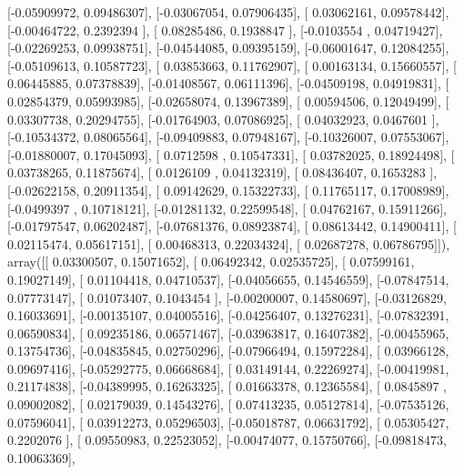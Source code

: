 \documentclass{article}
\begin{document}
       [-0.05909972,  0.09486307],
       [-0.03067054,  0.07906435],
       [ 0.03062161,  0.09578442],
       [-0.00464722,  0.2392394 ],
       [ 0.08285486,  0.1938847 ],
       [-0.0103554 ,  0.04719427],
       [-0.02269253,  0.09938751],
       [-0.04544085,  0.09395159],
       [-0.06001647,  0.12084255],
       [-0.05109613,  0.10587723],
       [ 0.03853663,  0.11762907],
       [ 0.00163134,  0.15660557],
       [ 0.06445885,  0.07378839],
       [-0.01408567,  0.06111396],
       [-0.04509198,  0.04919831],
       [ 0.02854379,  0.05993985],
       [-0.02658074,  0.13967389],
       [ 0.00594506,  0.12049499],
       [ 0.03307738,  0.20294755],
       [-0.01764903,  0.07086925],
       [ 0.04032923,  0.0467601 ],
       [-0.10534372,  0.08065564],
       [-0.09409883,  0.07948167],
       [-0.10326007,  0.07553067],
       [-0.01880007,  0.17045093],
       [ 0.0712598 ,  0.10547331],
       [ 0.03782025,  0.18924498],
       [ 0.03738265,  0.11875674],
       [ 0.0126109 ,  0.04132319],
       [ 0.08436407,  0.1653283 ],
       [-0.02622158,  0.20911354],
       [ 0.09142629,  0.15322733],
       [ 0.11765117,  0.17008989],
       [-0.0499397 ,  0.10718121],
       [-0.01281132,  0.22599548],
       [ 0.04762167,  0.15911266],
       [-0.01797547,  0.06202487],
       [-0.07681376,  0.08923874],
       [ 0.08613442,  0.14900411],
       [ 0.02115474,  0.05617151],
       [ 0.00468313,  0.22034324],
       [ 0.02687278,  0.06786795]]), array([[ 0.03300507,  0.15071652],
       [ 0.06492342,  0.02535725],
       [ 0.07599161,  0.19027149],
       [ 0.01104418,  0.04710537],
       [-0.04056655,  0.14546559],
       [-0.07847514,  0.07773147],
       [ 0.01073407,  0.1043454 ],
       [-0.00200007,  0.14580697],
       [-0.03126829,  0.16033691],
       [-0.00135107,  0.04005516],
       [-0.04256407,  0.13276231],
       [-0.07832391,  0.06590834],
       [ 0.09235186,  0.06571467],
       [-0.03963817,  0.16407382],
       [-0.00455965,  0.13754736],
       [-0.04835845,  0.02750296],
       [-0.07966494,  0.15972284],
       [ 0.03966128,  0.09697416],
       [-0.05292775,  0.06668684],
       [ 0.03149144,  0.22269274],
       [-0.00419981,  0.21174838],
       [-0.04389995,  0.16263325],
       [ 0.01663378,  0.12365584],
       [ 0.0845897 ,  0.09002082],
       [ 0.02179039,  0.14543276],
       [ 0.07413235,  0.05127814],
       [-0.07535126,  0.07596041],
       [ 0.03912273,  0.05296503],
       [-0.05018787,  0.06631792],
       [ 0.05305427,  0.2202076 ],
       [ 0.09550983,  0.22523052],
       [-0.00474077,  0.15750766],
       [-0.09818473,  0.10063369],
\end{document}
